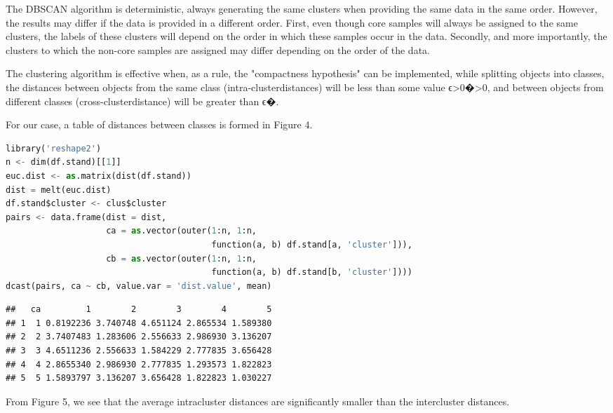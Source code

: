 \begin{multicols}{2}
The DBSCAN algorithm is deterministic, always generating the same
clusters when providing the same data in the same order. However, the
results may differ if the data is provided in a different order. First,
even though core samples will always be assigned to the same clusters,
the labels of these clusters will depend on the order in which these
samples occur in the data. Secondly, and more importantly, the clusters
to which the non-core samples are assigned may differ depending on the
order of the data.

The clustering algorithm is effective when, as a rule, the "compactness
hypothesis" can be implemented, while splitting objects into classes,
the distances between objects from the same class
(intra-clusterdistances) will be less than some value
ϵ\textgreater0�\textgreater0, and between objects from different classes
(cross-clusterdistance) will be greater than ϵ�.

For our case, a table of distances between classes is formed in Figure 4.
\end{multicols}

\begin{lstlisting}[language=Python]
library('reshape2')
n <- dim(df.stand)[[1]] 
euc.dist <- as.matrix(dist(df.stand))
dist = melt(euc.dist)
df.stand$cluster <- clus$cluster
pairs <- data.frame(dist = dist, 
                    ca = as.vector(outer(1:n, 1:n,
                                         function(a, b) df.stand[a, 'cluster'])),
                    cb = as.vector(outer(1:n, 1:n,
                                         function(a, b) df.stand[b, 'cluster'])))
dcast(pairs, ca ~ cb, value.var = 'dist.value', mean)
\end{lstlisting}
  
\begin{lstlisting}
##   ca         1        2        3        4        5
## 1  1 0.8192236 3.740748 4.651124 2.865534 1.589380
## 2  2 3.7407483 1.283606 2.556633 2.986930 3.136207
## 3  3 4.6511236 2.556633 1.584229 2.777835 3.656428
## 4  4 2.8655340 2.986930 2.777835 1.293573 1.822823
## 5  5 1.5893797 3.136207 3.656428 1.822823 1.030227
\end{lstlisting}

From Figure 5, we see that the average intracluster distances are
significantly smaller than the intercluster distances.

